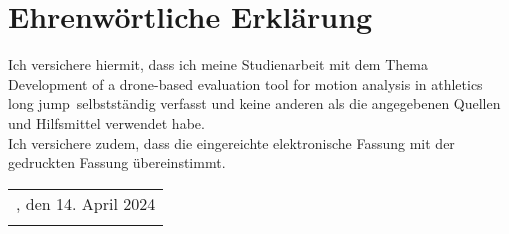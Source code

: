 \chapter*{Ehrenwörtliche Erklärung}
\thispagestyle{empty}

\vspace{5cm}
Ich versichere hiermit, dass ich meine Studienarbeit mit dem Thema
\glqq Development of a drone-based evaluation tool for motion analysis in
athletics long jump\grqq\ selbstständig verfasst und keine anderen als die
angegebenen Quellen und Hilfsmittel verwendet habe. \\
Ich versichere zudem, dass die eingereichte elektronische Fassung mit der
gedruckten Fassung übereinstimmt.

\vfill
\begin{tabular}{l}
	\hline
	\standort, den 14. April 2024\\
	\autor
\end{tabular}

